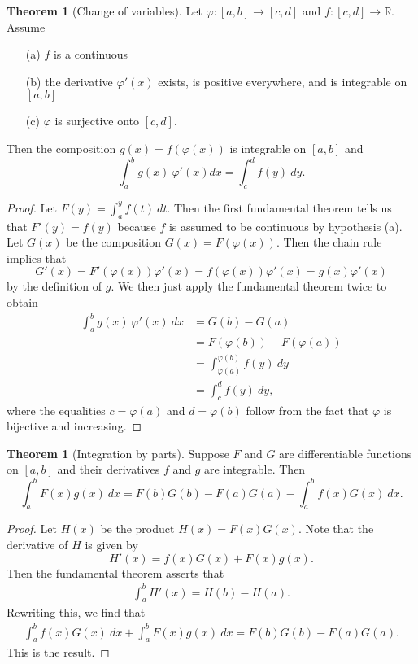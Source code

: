 \documentclass[12pt]{article}
\theoremstyle{definition}
\theoremstyle{theorem}
\newtheorem{theorem}[definition]{Theorem}
\begin{document}
\begin{theorem}[Change of variables]
Let $\varphi : [a,b] \to [c,d]$ and $f : [c,d] \to \mathbb{R}$. Assume 
\begin{enumerate}
\item[(a)] $f$ is a continuous
\item[(b)] the derivative $\varphi'(x)$ exists, is positive everywhere, and is integrable on $[a,b]$ 
\item[(c)] $\varphi$ is surjective onto $[c,d]$.
\end{enumerate} 
Then the composition $g(x) = f(\varphi(x))$ is integrable on $[a,b]$ and 
\[
\int_a^b g(x)\:\varphi'(x) dx = \int_c^d f(y) \: dy.
\]
\end{theorem}

\begin{proof}
Let $F(y) = \int_a^y f(t) \: dt$. Then the first fundamental theorem tells us that $F'(y) = f(y)$ because $f$ is assumed to be continuous by hypothesis (a). Let $G(x)$ be the composition $G(x) = F(\varphi(x))$. Then the chain rule implies that 
\[
G'(x) = F'(\varphi(x))\varphi'(x) = f(\varphi(x))\varphi'(x) = g(x) \varphi'(x)
\]
by the definition of $g$. We then just apply the fundamental theorem twice to obtain 
\begin{align*}
\int_a^b g(x) \: \varphi'(x) \: dx &= G(b) - G(a) \\
&= F(\varphi(b)) - F(\varphi(a)) \\
&= \int_{\varphi(a)}^{\varphi(b)} f(y) \: dy \\
&= \int_c^d f(y) \: dy,
\end{align*}
where the equalities $c = \varphi(a)$ and $d = \varphi(b)$ follow from the fact that $\varphi$ is bijective and increasing. 
\end{proof}

\begin{theorem}[Integration by parts]
Suppose $F$ and $G$ are differentiable functions on $[a,b]$ and their derivatives $f$ and $g$ are integrable. Then 
\[
\int_a^b F(x) g(x) \: dx = F(b)G(b) - F(a)G(a) - \int_{a}^b f(x) G(x) \: dx.
\]
\end{theorem}

\begin{proof}
Let $H(x)$ be the product $H(x) = F(x)G(x)$. Note that the derivative of $H$ is given by 
\[
H'(x) = f(x) G(x) + F(x)g(x).
\]
Then the fundamental theorem asserts that 
\begin{align*}
\int_a^b H'(x) = H(b) - H(a).
\end{align*}
Rewriting this, we find that 
\begin{align*}
\int_{a}^b f(x)G(x) \: dx + \int_{a}^b F(x) g(x) \: dx = F(b)G(b) - F(a) G(a).
\end{align*}
This is the result.
\end{proof}
\end{document}
